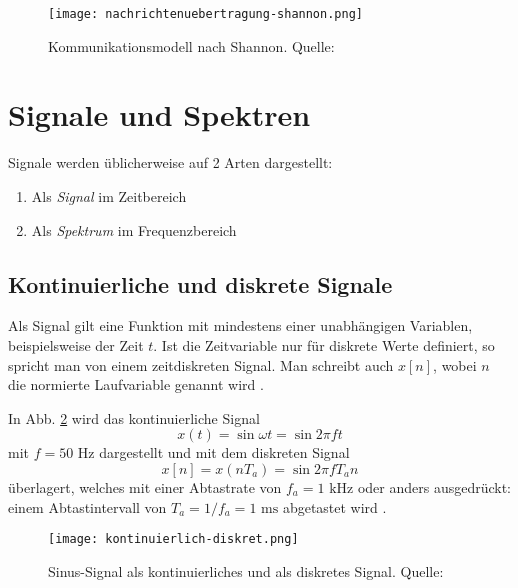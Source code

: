 \begin{figure}[ht]
	\centering
	\texttt{[image: nachrichtenuebertragung-shannon.png]}
	\caption[Kommunikationsmodell nach Shannon]{Kommunikationsmodell nach Shannon. Quelle: \cite[Werner, S. 11f]{Werner:2017}} 
	\label{nachrichtenuebertragung}
\end{figure}

\section{Signale und Spektren}
Signale werden üblicherweise auf 2 Arten dargestellt:
\begin{enumerate}
	\item Als \textit{Signal} im Zeitbereich
	\item Als \textit{Spektrum} im Frequenzbereich
\end{enumerate}

\subsection{Kontinuierliche und diskrete Signale}
Als Signal gilt eine Funktion mit mindestens einer unabhängigen Variablen, beispielsweise der Zeit \(t\). Ist die Zeitvariable nur für diskrete Werte definiert, so spricht man von einem zeitdiskreten Signal. Man schreibt auch \(x[n]\), wobei \(n\) die normierte Laufvariable genannt wird \cite[vgl. Werner, S. 24]{Werner:2017}.

In Abb. \ref{kontinuierlich_diskret} wird das kontinuierliche Signal
\[x(t) = \sin \omega t = \sin 2\pi f t\]
mit \(f = 50 \text{ Hz} \) dargestellt und mit dem diskreten Signal
\[x[n] = x(nT_a) = \sin 2\pi f T_a n\]
überlagert, welches mit einer Abtastrate von \(f_a = 1 \text{ kHz}\) oder anders ausgedrückt: einem Abtastintervall von \(T_a = 1 / f_a = 1 \text{ ms}\) abgetastet wird \cite[vgl. Heuberger, e. a., S. 11f]{Heuberger:2017}.

\begin{figure}[ht]
	\centering
	\texttt{[image: kontinuierlich-diskret.png]}
	\caption[Sinus-Signal als kontinuierliches und als diskretes Signal]{Sinus-Signal als kontinuierliches und als diskretes Signal. \newline Quelle: \cite[Heuberger, e. a., S. 12]{Heuberger:2017}} 
	\label{kontinuierlich_diskret}
\end{figure}

